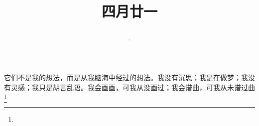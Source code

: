 \title{\date[d=28,m=5,y=2024][year:cn-y,年,month:cn,day:cn,日,·,weekday]·四月廿一 }
它们不是我的想法，而是从我脑海中经过的想法。我没有沉思；我是在做梦；我没有灵感；我只是胡言乱语。我会画画，可我从没画过；我会谱曲，可我从未谱过曲\footnote{ }

